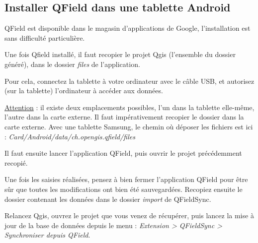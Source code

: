 \subsection{Installer QField dans une tablette Android}

QField est disponible dans le magasin d'applications de Google, l'installation est sans difficulté particulière.

Une fois Qfield installé, il faut recopier le projet Qgis (l'ensemble du dossier généré), dans le dossier \textit{files} de l'application. 

Pour cela, connectez la tablette à votre ordinateur avec le câble USB, et autorisez (sur la tablette) l'ordinateur à accéder aux données.

\underline{Attention} : il existe deux emplacements possibles, l'un dans la tablette elle-même, l'autre dans la carte externe. Il faut impérativement recopier le dossier dans la carte externe. 
Avec une tablette Samsung, le chemin où déposer les fichiers est ici : 
\textit{Card/Android/data/ch.opengis.qfield/files}

Il faut ensuite lancer l'application QField, puis ouvrir le projet précédemment recopié.

Une fois les saisies réalisées, pensez à bien fermer l'application QField pour être sûr que toutes les modifications ont bien été sauvegardées. Recopiez ensuite le dossier contenant les données dans le dossier \textit{import} de QFieldSync.

Relancez Qgis, ouvrez le projet que vous venez de récupérer, puis lancez la mise à jour de la base de données depuis le menu : \textit{Extension > QFieldSync > Synchroniser depuis QField}.


